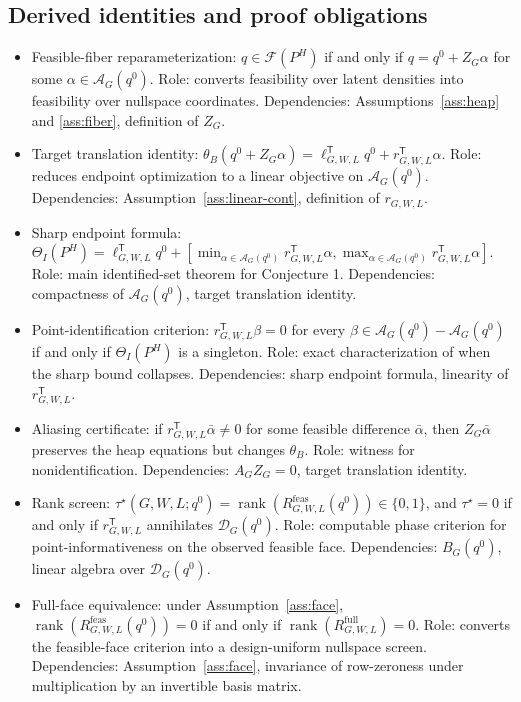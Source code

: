 \documentclass[11pt]{article}
\newcommand{\transpose}{\mathsf{T}}
\theoremstyle{definition}
\theoremstyle{plain}
\theoremstyle{remark}
\begin{document}
\subsection*{Derived identities and proof obligations}
\begin{itemize}[leftmargin=*]
  \item Feasible-fiber reparameterization: \(q\in\mathcal{F}(P^H)\) if and only if \(q=q^0+Z_G\alpha\) for some \(\alpha\in\mathcal{A}_G(q^0)\).  Role: converts feasibility over latent densities into feasibility over nullspace coordinates.  Dependencies: Assumptions~\ref{ass:heap} and \ref{ass:fiber}, definition of \(Z_G\).
  \item Target translation identity: \(\theta_B(q^0+Z_G\alpha)=\ell_{G,W,L}^{\transpose}q^0+r_{G,W,L}^{\transpose}\alpha\).  Role: reduces endpoint optimization to a linear objective on \(\mathcal{A}_G(q^0)\).  Dependencies: Assumption~\ref{ass:linear-cont}, definition of \(r_{G,W,L}\).
  \item Sharp endpoint formula: \(\Theta_I(P^H)=\ell_{G,W,L}^{\transpose}q^0+[\min_{\alpha\in\mathcal{A}_G(q^0)}r_{G,W,L}^{\transpose}\alpha,\max_{\alpha\in\mathcal{A}_G(q^0)}r_{G,W,L}^{\transpose}\alpha]\).  Role: main identified-set theorem for Conjecture 1.  Dependencies: compactness of \(\mathcal{A}_G(q^0)\), target translation identity.
  \item Point-identification criterion: \(r_{G,W,L}^{\transpose}\beta=0\) for every \(\beta\in\mathcal{A}_G(q^0)-\mathcal{A}_G(q^0)\) if and only if \(\Theta_I(P^H)\) is a singleton.  Role: exact characterization of when the sharp bound collapses.  Dependencies: sharp endpoint formula, linearity of \(r_{G,W,L}^{\transpose}\).
  \item Aliasing certificate: if \(r_{G,W,L}^{\transpose}\bar\alpha\neq0\) for some feasible difference \(\bar\alpha\), then \(Z_G\bar\alpha\) preserves the heap equations but changes \(\theta_B\).  Role: witness for nonidentification.  Dependencies: \(A_GZ_G=0\), target translation identity.
  \item Rank screen: \(\tau^\star(G,W,L;q^0)=\operatorname{rank}(R^{\mathrm{feas}}_{G,W,L}(q^0))\in\{0,1\}\), and \(\tau^\star=0\) if and only if \(r_{G,W,L}^{\transpose}\) annihilates \(\mathcal{D}_G(q^0)\).  Role: computable phase criterion for point-informativeness on the observed feasible face.  Dependencies: \(B_G(q^0)\), linear algebra over \(\mathcal{D}_G(q^0)\).
  \item Full-face equivalence: under Assumption~\ref{ass:face}, \(\operatorname{rank}(R^{\mathrm{feas}}_{G,W,L}(q^0))=0\) if and only if \(\operatorname{rank}(R^{\mathrm{full}}_{G,W,L})=0\).  Role: converts the feasible-face criterion into a design-uniform nullspace screen.  Dependencies: Assumption~\ref{ass:face}, invariance of row-zeroness under multiplication by an invertible basis matrix.
\end{itemize}
\end{document}
